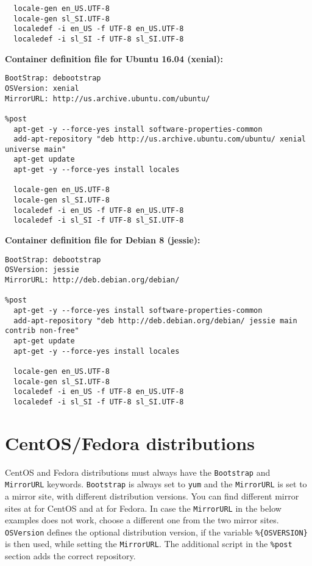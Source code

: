\documentclass[12pt,a4paper]{report}
\begin{document}
\begin{appendices}
\begin{lstlisting}
  locale-gen en_US.UTF-8
  locale-gen sl_SI.UTF-8
  localedef -i en_US -f UTF-8 en_US.UTF-8
  localedef -i sl_SI -f UTF-8 sl_SI.UTF-8
\end{lstlisting}
{\noindent}\textbf{Container definition file for Ubuntu 16.04 (xenial):}
\begin{lstlisting}
BootStrap: debootstrap
OSVersion: xenial
MirrorURL: http://us.archive.ubuntu.com/ubuntu/

%post
  apt-get -y --force-yes install software-properties-common
  add-apt-repository "deb http://us.archive.ubuntu.com/ubuntu/ xenial universe main"
  apt-get update
  apt-get -y --force-yes install locales
  
  locale-gen en_US.UTF-8
  locale-gen sl_SI.UTF-8
  localedef -i en_US -f UTF-8 en_US.UTF-8
  localedef -i sl_SI -f UTF-8 sl_SI.UTF-8
\end{lstlisting}
{\noindent}\textbf{Container definition file for Debian 8 (jessie):}
\begin{lstlisting}
BootStrap: debootstrap
OSVersion: jessie
MirrorURL: http://deb.debian.org/debian/

%post
  apt-get -y --force-yes install software-properties-common
  add-apt-repository "deb http://deb.debian.org/debian/ jessie main contrib non-free"
  apt-get update
  apt-get -y --force-yes install locales
  
  locale-gen en_US.UTF-8
  locale-gen sl_SI.UTF-8
  localedef -i en_US -f UTF-8 en_US.UTF-8
  localedef -i sl_SI -f UTF-8 sl_SI.UTF-8
\end{lstlisting}

\section{CentOS/Fedora distributions}
CentOS and Fedora distributions must always have the \texttt{Bootstrap} and \linebreak\texttt{MirrorURL} keywords. \texttt{Bootstrap} is always set to \texttt{yum} and the \texttt{MirrorURL} is set to a mirror site, with different distribution versions. You can find different mirror sites at \cite{centosmirror} for CentOS and at \cite{fedoramirror} for Fedora. In case the \texttt{MirrorURL} in the below examples does not work, choose a different one from the two mirror sites. \texttt{OSVersion} defines the optional distribution version, if the variable \texttt{\%\{OSVERSION\}} is then used, while setting the \texttt{MirrorURL}. The additional script in the \texttt{\%post} section adds the correct repository.\\


\end{appendices}
\end{document}
